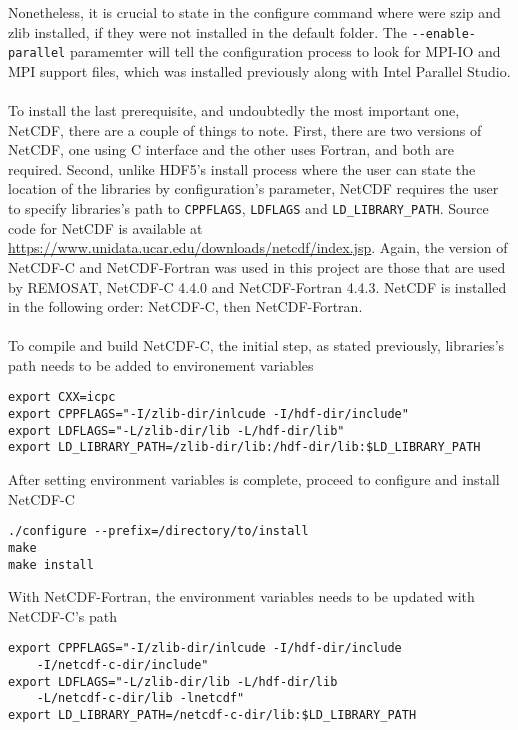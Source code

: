 Nonetheless, it is crucial to state in the configure command where were szip and zlib installed, if they were not installed in the default folder. The \verb|--enable-parallel| paramemter will tell the configuration process to look for MPI-IO and MPI support files, which was installed previously along with Intel Parallel Studio. \\
~\\
To install the last prerequisite, and undoubtedly the most important one, NetCDF, there are a couple of things to note. First, there are two versions of NetCDF, one using C interface and the other uses Fortran, and both are required. Second, unlike HDF5's install process where the user can state the location of the libraries by configuration's parameter, NetCDF requires the user to specify libraries's path to \verb|CPPFLAGS|, \verb|LDFLAGS| and \verb|LD_LIBRARY_PATH|. Source code for NetCDF is available at \url{https://www.unidata.ucar.edu/downloads/netcdf/index.jsp}. Again, the version of NetCDF-C and NetCDF-Fortran was used in this project are those that are used by REMOSAT, NetCDF-C 4.4.0 and NetCDF-Fortran 4.4.3. NetCDF is installed in the following order: NetCDF-C, then NetCDF-Fortran. \\
~\\
To compile and build NetCDF-C, the initial step, as stated previously, libraries's path needs to be added to environement variables
\begin{center}
\begin{BVerbatim}
export CXX=icpc
export CPPFLAGS="-I/zlib-dir/inlcude -I/hdf-dir/include"
export LDFLAGS="-L/zlib-dir/lib -L/hdf-dir/lib"
export LD_LIBRARY_PATH=/zlib-dir/lib:/hdf-dir/lib:$LD_LIBRARY_PATH
\end{BVerbatim}
\end{center}
After setting environment variables is complete, proceed to configure and install NetCDF-C
\begin{center}
\begin{BVerbatim}
./configure --prefix=/directory/to/install
make
make install
\end{BVerbatim}
\end{center}
With NetCDF-Fortran, the environment variables needs to be updated with NetCDF-C's path
\begin{center}
\begin{BVerbatim}
export CPPFLAGS="-I/zlib-dir/inlcude -I/hdf-dir/include 
	-I/netcdf-c-dir/include"
export LDFLAGS="-L/zlib-dir/lib -L/hdf-dir/lib 
	-L/netcdf-c-dir/lib -lnetcdf"
export LD_LIBRARY_PATH=/netcdf-c-dir/lib:$LD_LIBRARY_PATH
\end{BVerbatim}
\end{center}
